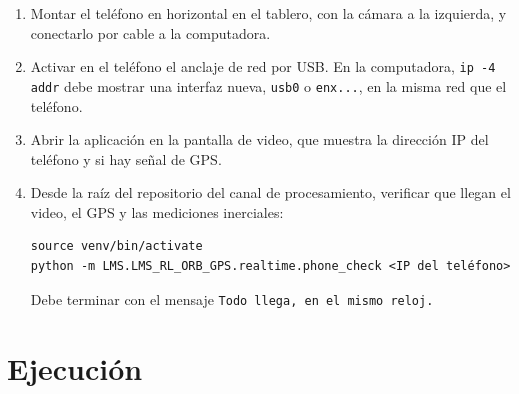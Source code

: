 \begin{enumerate}
\item Montar el teléfono en horizontal en el tablero, con la cámara a la izquierda, y conectarlo por cable a la computadora.

\item Activar en el teléfono el anclaje de red por USB.
En la computadora, \texttt{ip -4 addr} debe mostrar una interfaz nueva, \texttt{usb0} o \texttt{enx...}, en la misma red que el teléfono.

\item Abrir la aplicación en la pantalla de video, que muestra la dirección IP del teléfono y si hay señal de GPS.

\item Desde la raíz del repositorio del canal de procesamiento, verificar que llegan el video, el GPS y las mediciones inerciales:
\begin{small}
\begin{verbatim}
source venv/bin/activate
python -m LMS.LMS_RL_ORB_GPS.realtime.phone_check <IP del teléfono>
\end{verbatim}
\end{small}
Debe terminar con el mensaje \texttt{Todo llega, en el mismo reloj.}
\end{enumerate}

\section{Ejecución}

